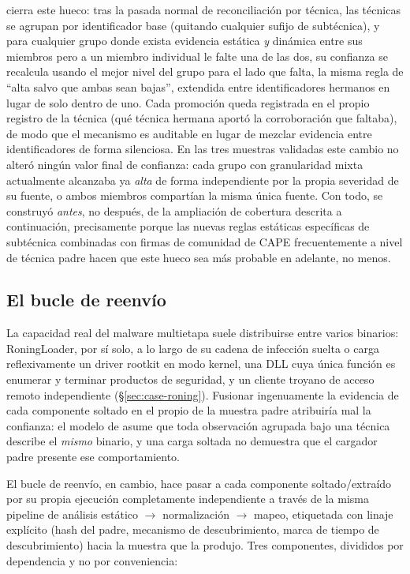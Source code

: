  cierra este hueco: tras la
pasada normal de reconciliaci\'on por t\'ecnica, las t\'ecnicas se
agrupan por identificador base (quitando cualquier sufijo de
subt\'ecnica), y para cualquier grupo donde exista evidencia est\'atica
\emph{y} din\'amica entre sus miembros pero a un miembro individual le
falte una de las dos, su confianza se recalcula usando el mejor nivel
del grupo para el lado que falta, la misma regla de ``alta salvo que
ambas sean bajas'', extendida entre identificadores hermanos en lugar
de solo dentro de uno. Cada promoci\'on queda registrada en el propio
registro de la t\'ecnica (qu\'e t\'ecnica hermana aport\'o la
corroboraci\'on que faltaba), de modo que el mecanismo es auditable en
lugar de mezclar evidencia entre identificadores de forma silenciosa.
En las tres muestras validadas este cambio no alter\'o ning\'un valor
final de confianza: cada grupo con granularidad mixta actualmente
alcanzaba ya \emph{alta} de forma independiente por la propia
severidad de su fuente, o ambos miembros compart\'ian la misma \'unica
fuente. Con todo, se construy\'o \emph{antes}, no despu\'es, de la
ampliaci\'on de cobertura descrita a continuaci\'on, precisamente
porque las nuevas reglas est\'aticas espec\'ificas de subt\'ecnica
combinadas con firmas de comunidad de CAPE frecuentemente a nivel de
t\'ecnica padre hacen que este hueco sea m\'as probable en adelante,
no menos.

\subsection{El bucle de reenv\'io}
\label{sec:resubmission}

La capacidad real del malware multietapa suele distribuirse entre
varios binarios: RoningLoader, por s\'i solo, a lo largo de su cadena
de infecci\'on suelta o carga reflexivamente un driver rootkit en modo
kernel, una DLL cuya \'unica funci\'on es enumerar y terminar productos
de seguridad, y un cliente troyano de acceso remoto independiente
(\S\ref{sec:case-roning}). Fusionar ingenuamente la evidencia de cada
componente soltado en el propio  de la
muestra padre atribuir\'ia mal la confianza: el modelo de
 asume que toda observaci\'on agrupada bajo una
t\'ecnica describe el \emph{mismo} binario, y una carga soltada no
demuestra que el cargador padre presente ese comportamiento.

El bucle de reenv\'io, en cambio, hace pasar a cada componente
soltado/extra\'ido por su propia ejecuci\'on completamente
independiente a trav\'es de la misma pipeline de an\'alisis
est\'atico $\rightarrow$ normalizaci\'on $\rightarrow$ mapeo, etiquetada
con linaje expl\'icito (hash del padre, mecanismo de descubrimiento,
marca de tiempo de descubrimiento) hacia la muestra que la produjo.
Tres componentes, divididos por dependencia y no por conveniencia:


